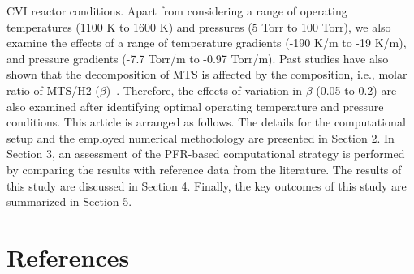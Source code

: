 \documentclass[final, letterpaper, square, comma, numbers, sort&compress]{elsarticle}
\begin{document}
CVI reactor conditions. Apart from considering a range of operating temperatures (1100 K to 1600 K) and
pressures (5 Torr to 100 Torr), we also examine the effects of a range of temperature gradients (-190 K/m
to -19 K/m), and pressure gradients (-7.7 Torr/m to -0.97 Torr/m). Past studies have also shown that the
decomposition of MTS is affected by the composition, i.e., molar ratio of MTS/H2 ($\beta$)~\cite{Peng2021}. Therefore, the
effects of variation in $\beta$ (0.05 to 0.2) are also examined after identifying optimal operating temperature and pressure conditions.
This article is arranged as follows. The details for the computational setup and the employed numerical
methodology are presented in Section 2. In Section 3, an assessment of the PFR-based computational
strategy is performed by comparing the results with reference data from the literature. The results of this
study are discussed in Section 4. Finally, the key outcomes of this study are summarized in Section 5.
\section{References}
\label{S.7}



\end{document}
